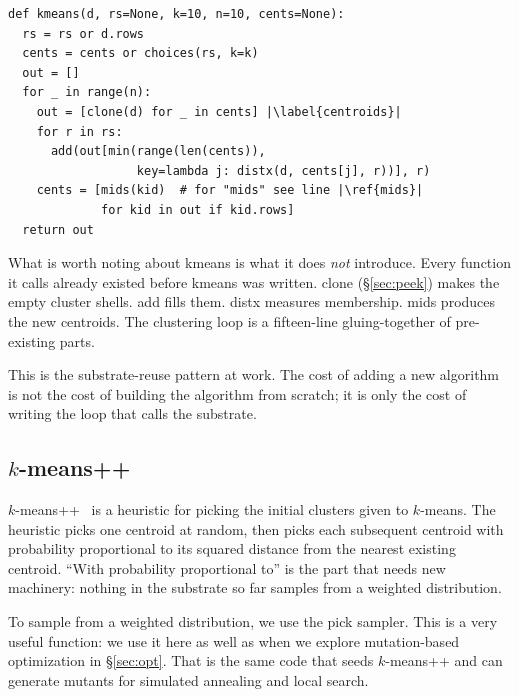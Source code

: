 \documentclass[AMA,STIX2COL]{WileyNJDv5}
\begin{document}
\begin{verbatim}
def kmeans(d, rs=None, k=10, n=10, cents=None):
  rs = rs or d.rows
  cents = cents or choices(rs, k=k)
  out = []
  for _ in range(n):
    out = [clone(d) for _ in cents] |\label{centroids}|
    for r in rs:
      add(out[min(range(len(cents)),
                  key=lambda j: distx(d, cents[j], r))], r)
    cents = [mids(kid)  # for "mids" see line |\ref{mids}|
             for kid in out if kid.rows]
  return out
\end{verbatim}
What is worth noting about \textsf{kmeans} is what it does
\emph{not} introduce. Every function it calls already existed
before \textsf{kmeans} was written. \textsf{clone}
(\S\ref{sec:peek}) makes the empty cluster shells. \textsf{add}
fills them. \textsf{distx} measures membership. \textsf{mids}
produces the new centroids. The clustering loop is a
fifteen-line gluing-together of pre-existing parts.

This is the substrate-reuse pattern at work. The cost of
adding a new algorithm is not the cost of building the
algorithm from scratch; it is only the cost of writing the
loop that calls the substrate.

\subsection{$k$-means++}

$k$-means++~\cite{arthur2007kmeanspp} is a heuristic for picking
the initial clusters given to $k$-means. The heuristic picks one
centroid at random, then picks each subsequent centroid with
probability proportional to its squared distance from the
nearest existing centroid. ``With probability proportional to''
is the part that needs new machinery: nothing in the substrate
so far samples from a weighted distribution.

To sample from a weighted distribution, we use the  
\textsf{pick} sampler. This is a very useful function: we use 
it here as well as when we explore
mutation-based optimization in \S\ref{sec:opt}.
That is  the same code that seeds $k$-means++ and can 
generate mutants for simulated annealing and local search. 
\end{document}
